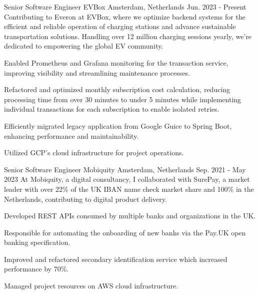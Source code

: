 

\begin{cventries}
  \cventry
  {Senior Software Engineer} %
  {EVBox} %
  {Amsterdam, Netherlands} %
  {Jun. 2023 - Present} %
  {
    Contributing to Everon at EVBox, where we optimize backend systems for the efficient and reliable operation of charging stations and advance sustainable transportation solutions. Handling over 12 million charging sessions yearly, we're dedicated to empowering the global EV community.
  }
  {
    \begin{cvitems} %
      \item {Enabled Prometheus and Grafana monitoring for the transaction service, improving visibility and streamlining maintenance processes.}
      \item {Refactored and optimized monthly subscription cost calculation, reducing processing time from over 30 minutes to under 5 minutes while implementing individual transactions for each subscription to enable isolated retries.}
      \item {Efficiently migrated legacy application from Google Guice to Spring Boot, enhancing performance and maintainability.}
      \item {Utilized GCP's cloud infrastructure for project operations.}
    \end{cvitems}
  }

  \cventry
    {Senior Software Engineer} %
    {Mobiquity} %
    {Amsterdam, Netherlands} %
    {Sep. 2021 - May 2023} %
    {
      At Mobiquity, a digital consultancy, I collaborated with SurePay, a market leader with over 22\% of the UK IBAN name check market share and 100\% in the Netherlands, contributing to digital product delivery.
    }
    {
      \begin{cvitems} %
        \item {Developed REST APIs consumed by multiple banks and organizations in the UK.}
        \item {Responsible for automating the onboarding of new banks via the Pay.UK open banking specification.}
        \item {Improved and refactored secondary identification service which increased performance by 70\%.}
        \item {Managed project resources on AWS cloud infrastructure.}
      \end{cvitems}
    }


\end{cventries}
